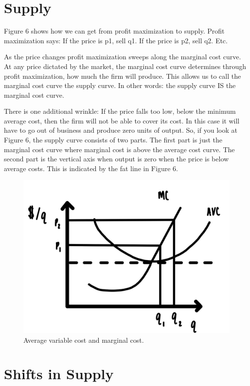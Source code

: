 \documentclass[
]{book}
\begin{document}
\hypertarget{supply-1}{%
\section{Supply}\label{supply-1}}

Figure 6 shows how we can get from profit maximization to supply. Profit maximization says:
If the price is p1, sell q1. If the price is p2, sell q2. Etc.

As the price changes profit maximization sweeps along the marginal cost curve. At any price dictated by the market, the marginal cost curve determines through profit maximization, how much the firm will produce. This allows us to call the marginal cost curve the supply curve. In other words: the supply curve IS the marginal cost curve.

There is one additional wrinkle: If the price falls too low, below the minimum average cost, then the firm will not be able to cover its cost. In this case it will have to go out of business and produce zero units of output. So, if you look at Figure 6, the supply curve consists of two parts. The first part is just the marginal cost curve where marginal cost is above the average cost curve. The second part is the vertical axis when output is zero when the price is below average costs. This is indicated by the fat line in Figure 6.

\begin{figure}

{\centering \includegraphics[width=0.75\linewidth]{img/ch4/fig6} 

}

\caption{Average variable cost and marginal cost.}\label{fig:fig406}
\end{figure}

\hypertarget{shifts-in-supply}{%
\section{Shifts in Supply}\label{shifts-in-supply}}
\end{document}
